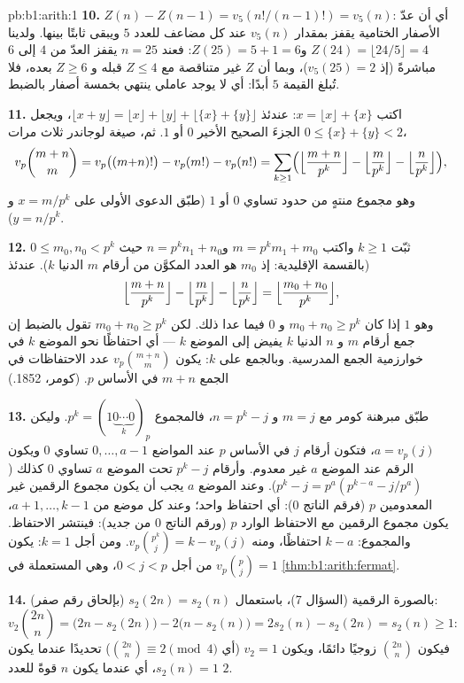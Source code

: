 \begin{solution}{pb:b1:arith:1}
\textbf{10.} $Z(n) - Z(n-1) = v_5(n!/(n-1)!) = v_5(n)$: أي أن عدّ
الأصفار الختامية يقفز بمقدار $v_5(n)$ عند كل مضاعف للعدد $5$ ويبقى
ثابتًا بينها. ولدينا $Z(24) = \lfloor24/5\rfloor = 4$ و$Z(25) =
5 + 1 = 6$: فعند $n = 25$ يقفز العدّ من $4$ إلى $6$ مباشرةً
(إذ $v_5(25) = 2$)، وبما أن $Z$ غير متناقصة مع $Z \leq 4$
قبله و $Z \geq 6$ بعده، فلا تُبلغ القيمة $5$ أبدًا: أي لا يوجد
عاملي ينتهي بخمسة أصفار بالضبط.

\textbf{11.} اكتب $x = \lfloor x\rfloor + \{x\}$: عندئذ $\lfloor x +
y\rfloor = \lfloor x\rfloor + \lfloor y\rfloor + \lfloor \{x\} +
\{y\}\rfloor$، ويجعل $0 \leq \{x\} + \{y\} < 2$ الجزءَ الصحيح الأخير
$0$ أو $1$. ثم،  صيغة لوجاندر ثلاث مرات،
\[
v_p\binom{m+n}m = v_p\bigl((m{+}n)!\bigr) - v_p(m!) - v_p(n!)
= \sum_{k\geq1}\Bigl(
\Bigl\lfloor\frac{m+n}{p^k}\Bigr\rfloor
- \Bigl\lfloor\frac{m}{p^k}\Bigr\rfloor
- \Bigl\lfloor\frac{n}{p^k}\Bigr\rfloor\Bigr),
\]
وهو مجموع منتهٍ من حدود تساوي $0$ أو $1$ (طبّق الدعوى الأولى على $x =
m/p^k$ و $y = n/p^k$).

\textbf{12.} ثبّت $k \geq 1$ واكتب $m = p^km_1 + m_0$ و$n =
p^kn_1 + n_0$ حيث $0 \leq m_0, n_0 < p^k$ (بالقسمة الإقليدية: إذ $m_0$ هو العدد المكوَّن من أرقام $m$ الدنيا $k$). عندئذ
\[
\Bigl\lfloor\frac{m+n}{p^k}\Bigr\rfloor
- \Bigl\lfloor\frac m{p^k}\Bigr\rfloor
- \Bigl\lfloor\frac n{p^k}\Bigr\rfloor
= \Bigl\lfloor\frac{m_0 + n_0}{p^k}\Bigr\rfloor ,
\]
وهو $1$ إذا كان $m_0 + n_0 \geq p^k$ و $0$ فيما عدا ذلك. لكن $m_0 +
n_0 \geq p^k$ تقول بالضبط إن جمع أرقام $m$ و $n$ الدنيا $k$
يفيض إلى الموضع $k$ --- أي احتفاظًا نحو الموضع $k$
في خوارزمية الجمع المدرسية. وبالجمع على $k$:
يكون $v_p\binom{m+n}m$ عدد الاحتفاظات في الجمع
$m + n$ في الأساس $p$. (كومر، 1852.)

\textbf{13.} طبّق مبرهنة كومر مع $m = j$ و $n = p^k - j$، فالمجموع $p^k =
(1\underbrace{0\cdots0}_{k})_p$. وليكن $a = v_p(j)$، فتكون أرقام $j$
في الأساس $p$ عند المواضع $0, \dots, a-1$ تساوي $0$ ويكون الرقم
عند الموضع $a$ غير معدوم. وأرقام $p^k - j$ تحت الموضع
$a$ تساوي $0$ كذلك ($p^k - j = p^a(p^{k-a} - j/p^a)$). وعند الموضع
$a$ يجب أن يكون مجموع الرقمين غير المعدومين $p$ (فرقم الناتج $0$):
أي احتفاظ واحد؛ وعند كل موضع من $a+1, \dots, k-1$، يكون مجموع الرقمين مع
الاحتفاظ الوارد $p$ (ورقم الناتج $0$ من جديد): فينتشر الاحتفاظ.
والمجموع: $k - a$ احتفاظًا، ومنه $v_p\binom{p^k}j = k -
v_p(j)$. ومن أجل $k = 1$: يكون $v_p\binom pj = 1$ من أجل $0 < j < p$، وهي
 المستعملة في \cref{thm:b1:arith:fermat}.

\textbf{14.} بالصورة الرقمية (السؤال 7)، باستعمال $s_2(2n) =
s_2(n)$ (بإلحاق رقم صفر):
\[
v_2\binom{2n}n = \bigl(2n - s_2(2n)\bigr) - 2\bigl(n -
s_2(n)\bigr) = 2s_2(n) - s_2(2n) = s_2(n) \geq 1 :
\]
فيكون $\binom{2n}n$ زوجيًا دائمًا، ويكون $v_2 = 1$ (أي $\binom{2n}n
\equiv 2 \pmod 4$) تحديدًا عندما يكون $s_2(n) = 1$، أي عندما يكون $n$ قوةً
للعدد $2$.


\end{solution}
